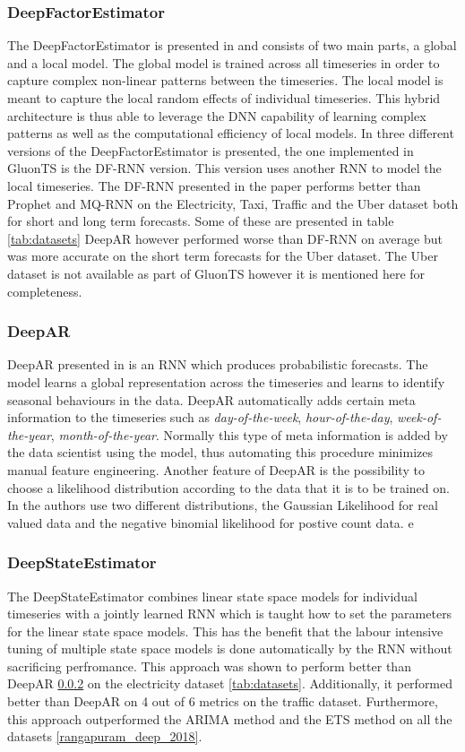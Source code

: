 \subsubsection{DeepFactorEstimator}
The DeepFactorEstimator is presented in \cite{wang_deep_2019} and consists of two main parts, a global and a local model. The global model is trained across all timeseries in order to capture complex non-linear patterns between the timeseries. The local model is meant to capture the local random effects of individual timeseries. This hybrid architecture is thus able to leverage the DNN capability of learning complex patterns as well as the computational efficiency of local models. In \cite{wang_deep_2019} three different versions of the DeepFactorEstimator is presented, the one implemented in GluonTS is the DF-RNN version. This version uses another RNN to model the local timeseries. The DF-RNN presented in the paper performs better than Prophet and MQ-RNN on the Electricity, Taxi, Traffic and the Uber dataset both for short and long term forecasts. Some of these are presented in table  \ref{tab:datasets} DeepAR however performed worse than DF-RNN on average but was more accurate on the short term forecasts for the Uber dataset. The Uber dataset is not available as part of GluonTS however it is mentioned here for completeness.

\subsubsection{DeepAR}  
\label{algo:deepar}
DeepAR presented in \cite{salinas_deepar_2019} is an RNN which produces probabilistic forecasts. The model learns a global representation across the timeseries and learns to identify seasonal behaviours in the data. DeepAR automatically adds certain meta information to the timeseries such as \textit{day-of-the-week}, \textit{hour-of-the-day}, \textit{week-of-the-year}, \textit{month-of-the-year}. Normally this type of meta information is added by the data scientist using the model, thus automating this procedure minimizes manual feature engineering. Another feature of DeepAR is the possibility to choose a likelihood distribution according to the data that it is to be trained on. In \cite{salinas_deepar_2019} the authors use two different distributions, the Gaussian Likelihood for real valued data and the negative binomial likelihood for postive count data. 
e
\subsubsection{DeepStateEstimator}
The DeepStateEstimator combines linear state space models for individual timeseries with a jointly learned RNN which is taught how to set the parameters for the linear state space models. This has the benefit that the labour intensive tuning of multiple state space models is done automatically by the RNN without sacrificing perfromance. This approach was shown to perform better than DeepAR \ref{algo:deepar} on the electricity dataset \ref{tab:datasets}. Additionally, it performed better than DeepAR on 4 out of 6 metrics on the traffic dataset. Furthermore, this approach outperformed the ARIMA method and the ETS method on all the datasets \ref{rangapuram_deep_2018}. 

